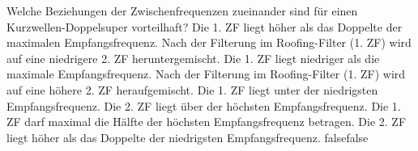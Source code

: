     {Welche Beziehungen der Zwischenfrequenzen zueinander sind für einen Kurzwellen-Doppelsuper vorteilhaft?}
    {Die 1. ZF liegt höher als das Doppelte der maximalen Empfangsfrequenz. Nach der Filterung im Roofing-Filter (1. ZF) wird auf eine niedrigere 2. ZF heruntergemischt.}
    {Die 1. ZF liegt niedriger als die maximale Empfangsfrequenz. Nach der Filterung im Roofing-Filter (1. ZF) wird auf eine höhere 2. ZF heraufgemischt.}
    {Die 1. ZF liegt unter der niedrigsten Empfangsfrequenz. Die 2. ZF liegt über der höchsten Empfangsfrequenz. }
    {Die 1. ZF darf maximal die Hälfte der höchsten Empfangsfrequenz betragen. Die 2. ZF liegt höher als das Doppelte der niedrigsten Empfangsfrequenz.}
    {false}{false}